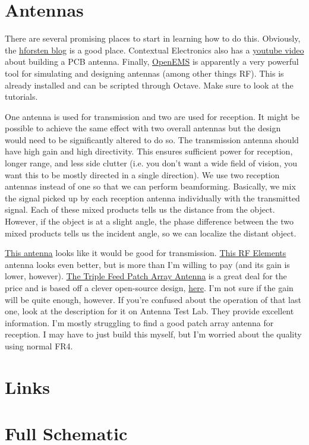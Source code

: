 \documentclass{default}
\newcounter{includepdfpage}
\begin{document}
\chapter{Antennas}
\label{cha:antennas}

There are several promising places to start in learning how to do this. Obviously, the
\href{hforsten.com}{hforsten blog} is a good place. Contextual Electronics also has a
\href{https://www.youtube.com/watch?v=m0B-63Q-R_8}{youtube video} about building a PCB
antenna. Finally, \href{http://openems.de/index.php/Main_Page.html}{OpenEMS} is apparently a very
powerful tool for simulating and designing antennas (among other things RF). This is already
installed and can be scripted through Octave. Make sure to look at the tutorials.

One antenna is used for transmission and two are used for reception. It might be possible to achieve
the same effect with two overall antennas but the design would need to be significantly altered to
do so. The transmission antenna should have high gain and high directivity. This ensures sufficient
power for reception, longer range, and less side clutter (i.e. you don't want a wide field of
vision, you want this to be mostly directed in a single direction). We use two reception antennas
instead of one so that we can perform beamforming. Basically, we mix the signal picked up by each
reception antenna individually with the transmitted signal. Each of these mixed products tells us
the distance from the object. However, if the object is at a slight angle, the phase difference
between the two mixed products tells us the incident angle, so we can localize the distant object.

\href{https://assets.lairdtech.com/home/brandworld/files/ANT-DS-PA58\%201115.pdf}{This antenna}
looks like it would be good for
transmission. \href{https://shop.bizsyscon.com/rf-elements-sh-cc-5-30-symmetrical-horn-carrier-class-30-degree.html#horizontalTab1}{This
  RF Elements} antenna looks even better, but is more than I'm willing to pay (and its gain is
lower,
however). \href{https://smile.amazon.com/d/Sewing-Machines-Accessories/9-4dBi-Triple-Antenna-Terminator-RJX1749/B074PR4TW3/ref=sr_1_8?ie=UTF8&qid=1544680544&sr=8-8&keywords=patch+antenna}{The
  Triple Feed Patch Array Antenna} is a great deal for the price and is based off a clever
open-source design,
\href{http://www.maartenbaert.be/quadcopters/antennas/triple-feed-patch-array-antenna/}{here}. I'm
not sure if the gain will be quite enough, however. If you're confused about the operation of that
last one, look at the description for it on Antenna Test Lab. They provide excellent
information. I'm mostly struggling to find a good patch array antenna for reception. I may have to
just build this myself, but I'm worried about the quality using normal FR4.

\chapter{Links}
\label{cha:links}


\chapter{Full Schematic}
\label{cha:schematic}


\end{document}
